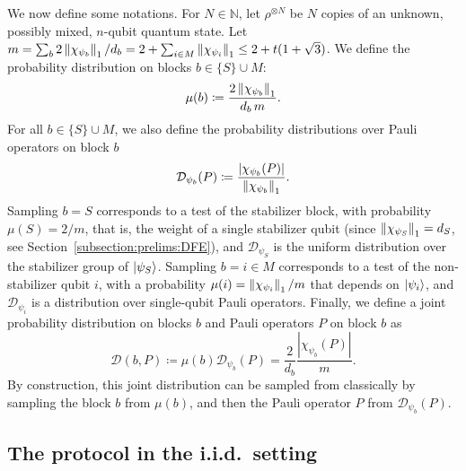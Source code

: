 \documentclass[a4paper,twocolumn,11pt,unpublished]{quantumarticle}
\newcommand{\np}{m}
\newcommand{\pdist}{\mathcal D} %
\begin{document}
            We now define some notations.
            For
            $N\in\mathbb
            N$, let $\rho^{\otimes N}$ be $N$ copies of an unknown, possibly mixed, $n$-qubit quantum state.
            Let $\np=\sum_b 2\norm{\chi_{\psi_b}}_1/d_b=2+\sum_{i\in M}\norm{\chi_{\psi_i}}_1\le 2+t(1+\sqrt3)$. We define the probability distribution on blocks $b\in\{S\}\cup M$:
            \begin{equation}
            \label{mu_i}
                \mu(b) \coloneqq \frac{2\norm{\chi_{\psi_b}}_1}{d_b\,\np}.
            \end{equation}
            For all $b\in\{S\}\cup M$, we also define the probability distributions over Pauli operators on block $b$
            \begin{equation}
            \label{Dpsi_iP}
                \mathcal{D}_{\psi_b}(P) \coloneqq \frac{|\chi_{\psi_b}(P)|}{\left\lVert\chi_{\psi_b}\right\rVert_1}.
            \end{equation}
            Sampling $b=S$ corresponds to a test of the stabilizer block, with probability $\mu(S)=2/\np$, that is, the weight of a single stabilizer qubit (since $\left\lVert\chi_{\psi_S}\right\rVert_1=d_S$, see Section~\ref{subsection:prelims:DFE}), and $\mathcal{D}_{\psi_S}$ is the uniform distribution over the stabilizer group of $\ket{\psi_S}$. Sampling $b=i\in M$ corresponds to a test of the non-stabilizer qubit $i$, with a probability $\mu(i)=\norm{\chi_{\psi_i}}_1/\np$ that depends on $\ket{\psi_i}$, and $\mathcal{D}_{\psi_i}$ is a distribution over single-qubit Pauli operators.
             Finally, we define a joint probability distribution on blocks $b$ and Pauli operators $P$ on block $b$ as
             \begin{equation}
            \label{DpsiPi}
                \pdist(b, P) \coloneqq \mu(b)\pdist_{\psi_b}(P)=\frac{2}{d_b}\frac{|\chi_{\psi_b}(P)|}{\np}.
            \end{equation}
            By construction, this joint distribution can be sampled from classically by sampling the block $b$ from $\mu(b)$, and then the Pauli operator $P$ from $\mathcal{D}_{\psi_b}(P)$.



            
\subsection{The protocol in the i.i.d.\ setting}
\label{subsection:iid}
%
%
%
%
%
\end{document}

